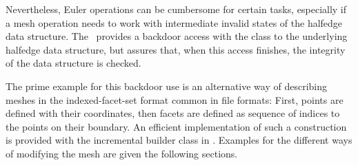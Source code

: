 Nevertheless, Euler operations can be cumbersome for certain tasks,
especially if a mesh operation needs to work with intermediate invalid
states of the halfedge data structure. The \cgalpoly\ provides a
backdoor access with the  class to the
underlying halfedge data structure, but assures that, when this access
finishes, the integrity of the data structure is checked.

The prime example for this backdoor use is an alternative way of
describing meshes in the indexed-facet-set format common in file
formats: First, points are defined with their coordinates, then facets
are defined as sequence of indices to the points on their boundary. An
efficient implementation of such a construction is provided with the
incremental builder class in \cgal. Examples for the different ways of
modifying the mesh are given the following sections.









